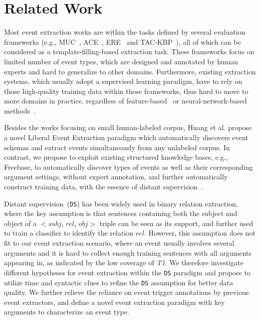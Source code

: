 \section{Related Work}
Most event extraction works are within the tasks defined by several evaluation frameworks (e.g., MUC~\cite{grishman1996message}, 
ACE~\cite{doddington2004automatic}, ERE~\cite{song2015light} and TAC-KBP~\cite{mitamura2015event}), 
all of which can be considered as a template-filling-based extraction task.
These frameworks focus on limited number of event types, which are designed and annotated by human experts and
hard to generalize to other domains.  
Furthermore, existing extraction systems, which usually adopt a supervised learning paradigm, 
have to rely on those high-quality training data within those frameworks, 
thus hard to move to more domains in practice, regardless of feature-based~\cite{gupta2009predicting,hong2011using,li2013joint} or neural-network-based methods~\cite{chen2015event,nguyen2016joint}.

Besides the works focusing on small human-labeled corpus, 
Huang et al.   propose a novel Liberal Event Extraction paradigm 
which automatically discovers event schemas and extract events simultaneously from any unlabeled corpus. 
In contrast, we propose to exploit existing structured knowledge bases, e.g., Freebase, to automatically discover 
types of events as well as their corresponding argument settings, without expert annotation, and further automatically
construct training data, with the essence of distant supervision~\cite{mintz2009distant}.

Distant supervision~(\texttt{DS}) has been widely used in binary relation extraction, where the key assumption is that 
 sentences containing both the subject and object of a $<$$subj$, $rel$, $obj$$>$ triple can be seen as its support, and further
used to train a classifier to identify the relation $rel$. However,  this assumption does not fit to our event extraction scenario, 
where an event usually involves several arguments and it is hard to collect enough training sentences with all arguments appearing in, as indicated by the low coverage of \textit{T1}. We therefore investigate different hypotheses  for event extraction within the \texttt{DS} paradigm and propose to utilize time and syntactic clues to refine the \texttt{DS} assumption for better data quality. We further relieve the reliance on event trigger annotations by previous event extractors, and define a novel event extraction paradigm with key arguments to characterize an event type. 

